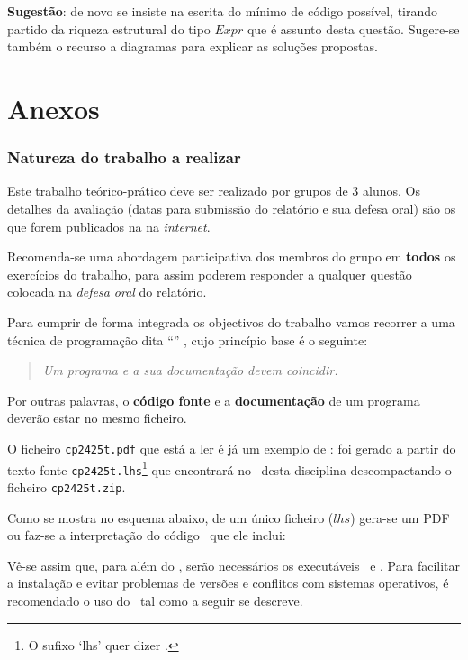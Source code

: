 \documentclass[11pt, a4paper, fleqn]{article}
\newcommand{\Conid}[1]{\mathit{#1}}
\newcommand{\Varid}[1]{\mathit{#1}}
\begin{document}
\noindent
\textbf{Sugestão}: de novo se insiste na escrita do mínimo de código possível,
tirando partido da riqueza estrutural do tipo \ensuremath{\Conid{Expr}} que é assunto desta questão.
Sugere-se também o recurso a diagramas para explicar as soluções propostas.

\part*{Anexos}

\appendix

\section{Natureza do trabalho a realizar}
\label{sec:documentacao}
Este trabalho teórico-prático deve ser realizado por grupos de 3 alunos.
Os detalhes da avaliação (datas para submissão do relatório e sua defesa
oral) são os que forem publicados na  na \emph{internet}.

Recomenda-se uma abordagem participativa dos membros do grupo em \textbf{todos}
os exercícios do trabalho, para assim poderem responder a qualquer questão
colocada na \emph{defesa oral} do relatório.

Para cumprir de forma integrada os objectivos do trabalho vamos recorrer
a uma técnica de programa\-ção dita ``'' \cite{Kn92}, cujo
princípio base é o seguinte:
%
\begin{quote}\em
	Um programa e a sua documentação devem coincidir.
\end{quote}
%
Por outras palavras, o \textbf{código fonte} e a \textbf{documentação} de um
programa deverão estar no mesmo ficheiro.

O ficheiro \texttt{cp2425t.pdf} que está a ler é já um exemplo de
: foi gerado a partir do texto fonte
\texttt{cp2425t.lhs}\footnote{O sufixo `lhs' quer dizer
\emph{}.} que encontrará no \MaterialPedagogico\
desta disciplina des\-com\-pactando o ficheiro \texttt{cp2425t.zip}.

Como se mostra no esquema abaixo, de um único ficheiro (\ensuremath{\Varid{lhs}})
gera-se um PDF ou faz-se a interpretação do código \Haskell\ que ele inclui:

	\esquema

Vê-se assim que, para além do \GHCi, serão necessários os executáveis \PdfLatex\ e
\LhsToTeX. Para facilitar a instalação e evitar problemas de versões e
conflitos com sistemas operativos, é recomendado o uso do \Docker\ tal como
a seguir se descreve.
\end{document}
